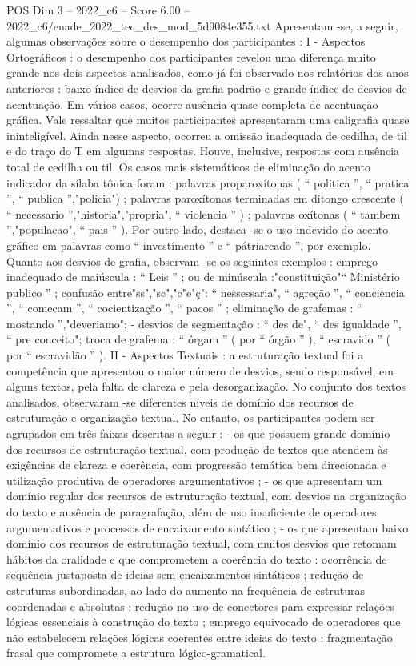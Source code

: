 \begin{textsample}{POS Dim 3 – 2022\_c6 – Score 6.00 – 2022\_c6/enade\_2022\_tec\_des\_mod\_5d9084e355.txt}
Apresentam -se, a seguir, algumas observações sobre o desempenho dos participantes : I - Aspectos Ortográficos : o desempenho dos participantes revelou uma diferença muito grande nos dois aspectos analisados, como já foi observado nos relatórios dos anos anteriores : baixo índice de desvios da grafia padrão e grande índice de desvios de acentuação.
Em vários casos, ocorre ausência quase completa de acentuação gráfica.
Vale ressaltar que muitos participantes apresentaram uma caligrafia quase ininteligível.
Ainda nesse aspecto, ocorreu a omissão inadequada de cedilha, de til e do traço do T em algumas respostas.
Houve, inclusive, respostas com ausência total de cedilha ou til.
Os casos mais sistemáticos de eliminação do acento indicador da sílaba tônica foram : palavras proparoxítonas ( “ politica ”, “ pratica ”, “ publica ”,"policia") ; palavras paroxítonas terminadas em ditongo crescente ( “ necessario ”,"historia","propria", “ violencia ” ) ; palavras oxítonas ( “ tambem ”,"populacao", “ pais ” ).
Por outro lado, destaca -se o uso indevido do acento gráfico em palavras como “ investímento ” e “ pátriarcado ”, por exemplo.
Quanto aos desvios de grafia, observam -se os seguintes exemplos : emprego inadequado de maiúscula : “ Leis ” ; ou de minúscula :"constituição"“ Ministério publico ” ; confusão entre"ss","sc","c"e"ç": “ nessessaria", “ agreção ”, “ conciencia ”, “ comecam ”, “ cocientização ”, “ pacos ” ; eliminação de grafemas : “ mostando ”,"deveriamo"; - desvios de segmentação : “ des de", “ des igualdade ”, “ pre conceito"; troca de grafema : “ órgam ” ( por “ órgão ” ), “ escravido ” ( por “ escravidão ” ).
II - Aspectos Textuais : a estruturação textual foi a competência que apresentou o maior número de desvios, sendo responsável, em alguns textos, pela falta de clareza e pela desorganização.
No conjunto dos textos analisados, observaram -se diferentes níveis de domínio dos recursos de estruturação e organização textual.
No entanto, os participantes podem ser agrupados em três faixas descritas a seguir : - os que possuem grande domínio dos recursos de estruturação textual, com produção de textos que atendem às exigências de clareza e coerência, com progressão temática bem direcionada e utilização produtiva de operadores argumentativos ; - os que apresentam um domínio regular dos recursos de estruturação textual, com desvios na organização do texto e ausência de paragrafação, além de uso insuficiente de operadores argumentativos e processos de encaixamento sintático ; - os que apresentam baixo domínio dos recursos de estruturação textual, com muitos desvios que retomam hábitos da oralidade e que comprometem a coerência do texto : ocorrência de sequência justaposta de ideias sem encaixamentos sintáticos ; redução de estruturas subordinadas, ao lado do aumento na frequência de estruturas coordenadas e absolutas ; redução no uso de conectores para expressar relações lógicas essenciais à construção do texto ; emprego equivocado de operadores que não estabelecem relações lógicas coerentes entre ideias do texto ; fragmentação frasal que compromete a estrutura lógico-gramatical.

\end{textsample}
